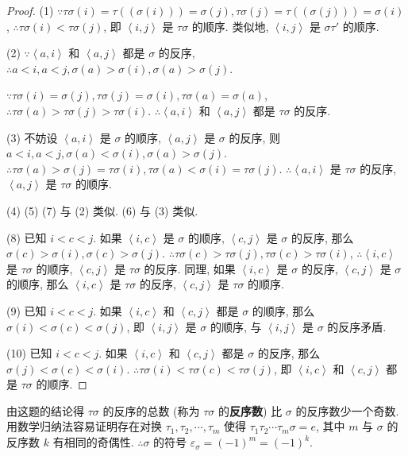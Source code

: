 \documentclass[color=black,device=normal,lang=cn,mode=geye]{elegantnote}
\begin{document}
\begin{proof}
    (1) $\because\tau\sigma(i)=\tau((\sigma(i)))=\sigma(j),\tau\sigma(j)=\tau((\sigma(j)))=\sigma(i)$, $\therefore\tau\sigma(i)<\tau\sigma(j)$, 即 $\left<i,j\right>$ 是 $\tau\sigma$ 的顺序. 类似地, $\left<i,j\right>$ 是 $\sigma\tau'$ 的顺序.

    (2) $\because\left<a,i\right>$ 和 $\left<a,j\right>$ 都是 $\sigma$ 的反序, $\therefore a<i,a<j,\sigma(a)>\sigma(i),\sigma(a)>\sigma(j)$.

    $\because\tau\sigma(i)=\sigma(j),\tau\sigma(j)=\sigma(i),\tau\sigma(a)=\sigma(a)$, $\therefore\tau\sigma(a)>\tau\sigma(j)>\tau\sigma(i)$. $\therefore\left<a,i\right>$ 和 $\left<a,j\right>$ 都是 $\tau\sigma$ 的反序.

    (3) 不妨设 $\left<a,i\right>$ 是 $\sigma$ 的顺序, $\left<a,j\right>$ 是 $\sigma$ 的反序, 则 $a<i,a<j,\sigma(a)<\sigma(i),\sigma(a)>\sigma(j)$. $\therefore\tau\sigma(a)>\sigma(j)=\tau\sigma(i),\tau\sigma(a)<\sigma(i)=\tau\sigma(j)$. $\therefore\left<a,i\right>$ 是 $\tau\sigma$ 的反序, $\left<a,j\right>$ 是 $\tau\sigma$ 的顺序.

    (4) (5) (7) 与 (2) 类似. (6) 与 (3) 类似.

    (8) 已知 $i<c<j$. 如果 $\left<i,c\right>$ 是 $\sigma$ 的顺序, $\left<c,j\right>$ 是 $\sigma$ 的反序, 那么 $\sigma(c)>\sigma(i),\sigma(c)>\sigma(j)$. $\therefore\tau\sigma(c)>\tau\sigma(j),\tau\sigma(c)>\tau\sigma(i)$, $\therefore\left<i,c\right>$ 是 $\tau\sigma$ 的顺序, $\left<c,j\right>$ 是 $\tau\sigma$ 的反序. 同理, 如果 $\left<i,c\right>$ 是 $\sigma$ 的反序, $\left<c,j\right>$ 是 $\sigma$ 的顺序, 那么 $\left<i,c\right>$ 是 $\tau\sigma$ 的反序, $\left<c,j\right>$ 是 $\tau\sigma$ 的顺序.

    (9) 已知 $i<c<j$. 如果 $\left<i,c\right>$ 和 $\left<c,j\right>$ 都是 $\sigma$ 的顺序, 那么 $\sigma(i)<\sigma(c)<\sigma(j)$, 即 $\left<i,j\right>$ 是 $\sigma$ 的顺序, 与 $\left<i,j\right>$ 是 $\sigma$ 的反序矛盾.

    (10) 已知 $i<c<j$. 如果 $\left<i,c\right>$ 和 $\left<c,j\right>$ 都是 $\sigma$ 的反序, 那么 $\sigma(j)<\sigma(c)<\sigma(i)$. $\therefore\tau\sigma(i)<\tau\sigma(c)<\tau\sigma(j)$, 即 $\left<i,c\right>$ 和 $\left<c,j\right>$ 都是 $\tau\sigma$ 的顺序.
\end{proof}
\begin{note}
    由这题的结论得 $\tau\sigma$ 的反序的总数 (称为 $\tau\sigma$ 的\textbf{反序数}) 比 $\sigma$ 的反序数少一个奇数. 用数学归纳法容易证明存在对换 $\tau_1,\tau_2,\cdots,\tau_m$ 使得 $\tau_1\tau_2\cdots\tau_m\sigma=e$, 其中 $m$ 与 $\sigma$ 的反序数 $k$ 有相同的奇偶性. $\therefore\sigma$ 的符号 $\varepsilon_\sigma=(-1)^m=(-1)^k$.
\end{note}
\end{document}
